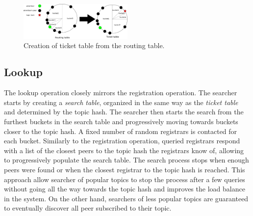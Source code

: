 \begin{figure}
    \includegraphics[width=0.5\textwidth]{img/ticket_table}
    \caption{Creation of ticket table from the routing table.}
    \label{fig:ticket_table}
 \end{figure}

\subsection{Lookup}
The lookup operation closely mirrors the registration operation. The searcher starts by creating a \emph{search table}, organized in the same way as the \emph{ticket table} and determined by the topic hash. The searcher then starts the search from the furthest buckets in the search table and progressively moving towards buckets closer to the topic hash. A fixed number of random registrars is contacted for each bucket. Similarly to the registration operation, queried registrars respond with a list of the closest peers to the topic hash the registrars know of, allowing to progressively populate the search table. The search process stops when enough peers were found or when the closest registrar to the topic hash is reached. This approach allow searcher of popular topics to stop the process after a few queries without going all the way towards the topic hash and improves the load balance in the system. On the other hand, searchers of less popular topics are guaranteed to eventually discover all peer subscribed to their topic. 
\fi
